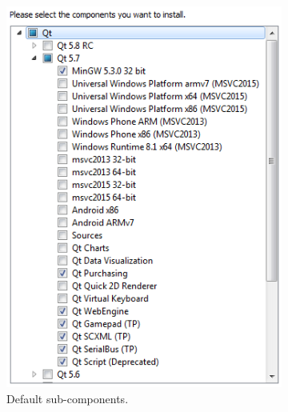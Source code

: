 \begin{figure} [h] %
\centering
\begin{subfigure}{.5\textwidth}
  \centering
  \includegraphics[width=.9\textwidth]{graphics/qt-setup-win-3.png}
  \caption{Default sub-components.}
\end{subfigure}%
\begin{subfigure}{.5\textwidth}
  \centering

\end{subfigure}
\end{figure}
